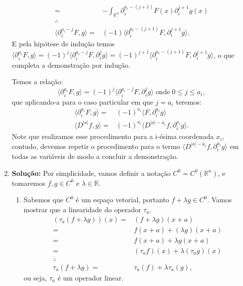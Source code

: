 \documentclass{article}
\begin{document}
\begin{enumerate}
$$\begin{aligned}
		\\
		= & - \int_{\mathbb{R}^{n}} \partial^{a_{i}-(j+1)}_{i}F(x) \partial^{j+1}_{i}g(x)
		\\
		\therefore
		\\
		\langle \partial^{a_{i}-j}_{i}F, g \rangle = & (-1)\langle \partial^{a_{i}-(j+1)}_{i}F, \partial^{j+1}_{i}g \rangle.
		\end{aligned}
		$$
		E pela hipótese de indução temos $\langle \partial^{a_{i}}_{i}F, g \rangle = (-1)^{j} \langle \partial^{a_{i}-j}_{i}F, \partial^{j}_{i}g \rangle = (-1)^{j+1}\langle \partial^{a_{i}-(j+1)}_{i}F, \partial^{j+1}_{i}g \rangle$, o que completa a demonstração por indução.
		
		Temos a relação:
		$$
		\langle \partial^{a_{i}}_{i}F, g \rangle = (-1)^{j}\langle \partial^{a_{i}-j}_{i}F, \partial^{j}_{i}g \rangle \; \text{onde} \; 0 \leq j \leq a_{i},
		$$
		que aplicando-a para o caso particular em que $j = a_{i}$ teremos: 
		$$
		\begin{aligned}
		\langle \partial^{a_{i}}_{i}F, g \rangle = & (-1)^{a_{i}}\langle F, \partial^{a_{i}}_{i}g \rangle
		\\
		\langle D^{|a|}f, g \rangle = & (-1)^{a_{i}}\langle  D^{|a|-a_{i}}f, \partial^{a_{i}}_{i}g \rangle.
		\end{aligned}
		$$
		Note que realizamos esse procedimento para a i-ésima coordenada $x_{i}$, contudo, devemos repetir o procedimento para o termo  $\langle  D^{|a|-a_{i}}f, \partial^{a_{i}}_{i}g \rangle$ em todas as variáveis de modo a concluir a demonstração.
		
		\item \textbf{Solução:} Por simplicidade, vamos definir a notação $C^{0} = C^{0}(\mathbb{R}^{n})$, e tomaremos $f, g \in C^{0}$ e $\lambda \in \mathbb{R}$.
			\begin{enumerate}
				\item Sabemos que $C^{0}$ é um espaço vetorial, portanto $f + \lambda g \in C^{0}$. Vamos mostrar que a linearidade do operador $\tau_{a}$.
				$$
				\begin{aligned}
				(\tau_{a}(f+\lambda g))(x) = &  (f+\lambda g)(x+a) \\
				= & f(x+a) +(\lambda g)(x+a)
				\\
				= & f(x+a) +\lambda g(x+a)
				\\
				= & (\tau_{a}f)(x) +\lambda (\tau_{a}g)(x)
				\\
				\therefore &
				\\
				\tau_{a}(f+\lambda g) = & \tau_{a}(f)+\lambda \tau_{a}(g),
				\end{aligned}
				$$
				ou seja, $\tau_{a}$ é um operador linear.
				

\end{enumerate}
\end{enumerate}
\end{document}
